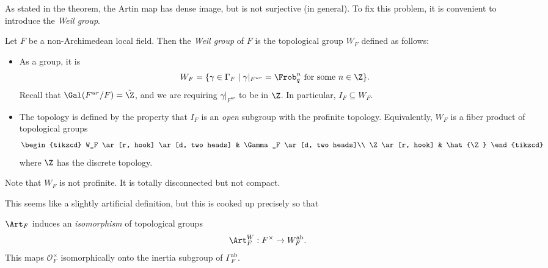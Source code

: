 \documentclass[a4paper]{article}
\newcommand\ab{\mathrm{ab}}
\begin{document}
As stated in the theorem, the Artin map has dense image, but is not surjective (in general). To fix this problem, it is convenient to introduce the \emph{Weil group}.
\begin{defi}
  Let $F$ be a non-Archimedean local field. Then the \emph{Weil group} of $F$ is the topological group $W_F$ defined as follows:
  \begin{itemize}
    \item As a group, it is
      \[
        W_F = \{\gamma \in \Gamma_F \mid \gamma|_{F^{ur}} = \Frob_q^n\text{ for some }n \in \Z\}.
      \]
      Recall that $\Gal(F^{ur}/F) = \hat{\Z}$, and we are requiring $\gamma|_{F^{ur}}$ to be in $\Z$. In particular, $I_F \subseteq W_F$.
    \item The topology is defined by the property that $I_F$ is an \emph{open} subgroup with the profinite topology. Equivalently, $W_F$ is a fiber product of topological groups
      \[
        \begin{tikzcd}
          W_F \ar[r, hook] \ar[d, two heads] & \Gamma_F \ar[d, two heads]\\
          \Z \ar[r, hook] & \hat{\Z}
        \end{tikzcd}
      \]
      where $\Z$ has the discrete topology.
  \end{itemize}
\end{defi}
Note that $W_F$ is not profinite. It is totally disconnected but not compact.

This seems like a slightly artificial definition, but this is cooked up precisely so that
\begin{prop}
  $\Art_F$ induces an \emph{isomorphism} of topological groups
  \[
    \Art_F^W: F^\times \to W_F^{\ab}.
  \]
  This maps $\mathcal{O}_F^\times$ isomorphically onto the inertia subgroup of $\Gamma_F^{\ab}$.
\end{prop}
\end{document}
